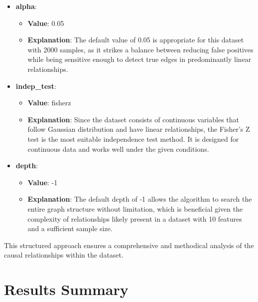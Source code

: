 \documentclass{article}
\begin{document}
\begin{itemize}

\item \textbf{alpha}:
\begin{itemize}
    \item \textbf{Value}: 0.05
    \item \textbf{Explanation}: The default value of 0.05 is appropriate for this dataset with 2000 samples, as it strikes a balance between reducing false positives while being sensitive enough to detect true edges in predominantly linear relationships.
\end{itemize}

\item \textbf{indep\_test}:
\begin{itemize}
    \item \textbf{Value}: fisherz
    \item \textbf{Explanation}: Since the dataset consists of continuous variables that follow Gaussian distribution and have linear relationships, the Fisher's Z test is the most suitable independence test method. It is designed for continuous data and works well under the given conditions.
\end{itemize}

\item \textbf{depth}:
\begin{itemize}
    \item \textbf{Value}: -1
    \item \textbf{Explanation}: The default depth of -1 allows the algorithm to search the entire graph structure without limitation, which is beneficial given the complexity of relationships likely present in a dataset with 10 features and a sufficient sample size.
\end{itemize}

\end{itemize}
        
This structured approach ensures a comprehensive and methodical analysis of the causal relationships within the dataset.

\section{Results Summary}
\end{document}
